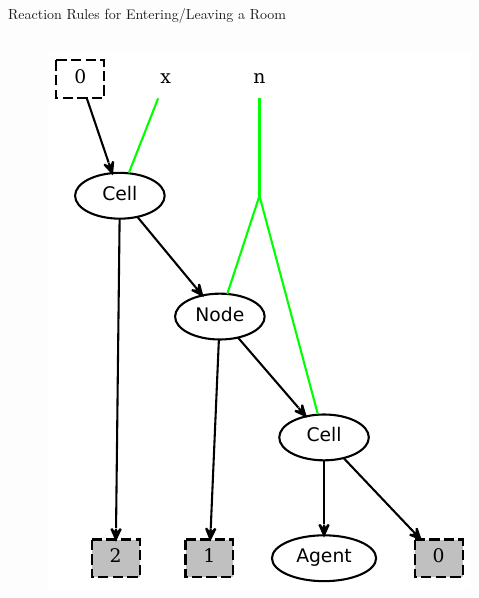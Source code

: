 \documentclass{beamer}
\begin{document}
\begin{frame}{Reaction Rules for Entering/Leaving a Room}
\begin{columns}
\begin{column}{0.45\textwidth}
\begin{figure}
        \includegraphics[width=\textwidth]{../models/agent2/goIn_rhs.pdf}
      \end{figure}
    \end{column}
  \end{columns}
\end{frame}
\end{document}
